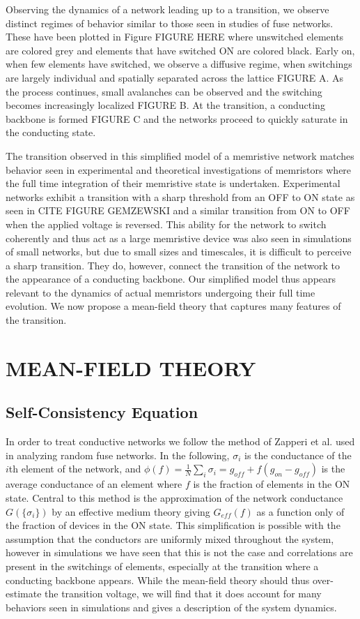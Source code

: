\documentclass[aps,prl,reprint,groupedaddress]{revtex4-1}
\begin{document}
Observing the dynamics of a network leading up to a transition, we observe
distinct regimes of behavior similar to those seen in studies of fuse
networks. These have been plotted in Figure FIGURE HERE
where unswitched elements are colored grey and elements that have switched
ON are colored black. Early on, when few elements have switched,
we observe a diffusive regime, when switchings are largely individual and
spatially separated across the lattice FIGURE A.  As the process continues,
small avalanches can be observed and the switching becomes increasingly
localized FIGURE B.  At the transition, a conducting backbone is formed
FIGURE C and the networks proceed to quickly saturate in the conducting state.

The transition observed in this simplified model of a memristive network
matches behavior seen in experimental and theoretical investigations of
memristors where the full time integration of their memristive state is
undertaken.  Experimental networks exhibit a transition with a sharp
threshold from an OFF to ON state as seen in CITE FIGURE GEMZEWSKI and a
similar transition from ON to OFF when the applied voltage is reversed.
This ability for the network to switch coherently and thus act as a large
memristive device was also seen in simulations of small networks, but due to
small sizes and timescales, it is difficult to perceive a sharp transition.
They do, however, connect the transition of the network to the appearance of
a conducting backbone.  Our simplified model thus appears relevant to the
dynamics of actual memristors undergoing their full time evolution.  We now
propose a mean-field theory that captures many features of the transition.

\section{MEAN-FIELD THEORY}

\subsection{Self-Consistency Equation}

In order to treat conductive networks we follow the method of Zapperi et al.
\cite{Zapperi1999} used in analyzing random fuse networks.  In the following,
$\sigma_i$ is the conductance of the $i$th element of the network,
and \(\phi(f) = \frac{1}{N}\sum_i \sigma_i = g_{off} + f (g_{on} - g_{off})\)
is the average conductance of an element where $f$ is the fraction of elements
in the ON state. Central to this method is the approximation of the network
conductance $G(\{\sigma_i\})$ by an effective medium theory giving $G_{eff}(f)$
as a function only of the fraction of devices in the ON state.  This
simplification is possible with the assumption that the conductors are
uniformly mixed throughout the system, however in simulations we have seen
that this is not the case and correlations are present in the switchings of
elements, especially at the transition where a conducting backbone appears.
While the mean-field theory should thus over-estimate the transition voltage,
we will find that it does account for many behaviors seen in simulations and
gives a description of the system dynamics.
\end{document}

